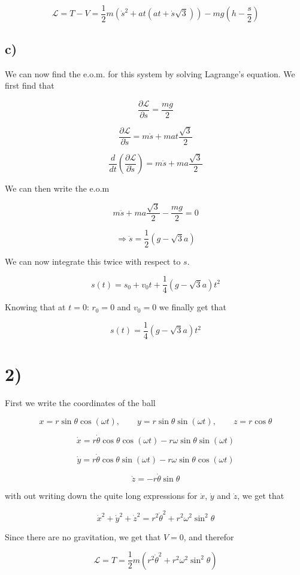\documentclass[a4paper,norsk, 10pt]{article}
\begin{document}
$$
\mathcal{L} = T -V = \frac{1}{2}m(\dot{s}^2 + at(at + \dot{s}\sqrt{3})) - mg(h-\frac{s}{2})
$$

\subsection*{c)}
We can now find the e.o.m. for this system by solving Lagrange's equation. We first find that

$$
\frac{\partial \mathcal{L}}{\partial s} = \frac{mg}{2}
$$

$$
\frac{\partial \mathcal{L}}{\partial \dot{s}} = m\dot{s} +mat\frac{\sqrt{3}}{2}
$$

$$
\frac{d}{dt}\left(\frac{\partial \mathcal{L}}{\partial \dot{s}} \right) = m\ddot{s} + ma\frac{\sqrt{3}}{2}
$$

We can then write the e.o.m

$$
m\ddot{s} + ma\frac{\sqrt{3}}{2} - \frac{mg}{2} = 0
$$

$$
\Rightarrow \ddot{s} = \frac{1}{2}(g-\sqrt{3}a)
$$

We can now integrate this twice with respect to $s$.

$$
s(t) = s_0 +v_0t + \frac{1}{4}(g-\sqrt{3}a)t^2
$$

Knowing that at $t=0$: $r_0 = 0$ and $v_0 = 0$ we finally get that

$$
s(t) = \frac{1}{4}(g-\sqrt{3}a)t^2
$$

\section*{2)}
First we write the coordinates of the ball

$$
x = r\sin\theta \cos(\omega t), \qquad y = r\sin\theta \sin(\omega t), \qquad z = r\cos \theta
$$

$$
\dot{x} = r\dot{\theta}\cos\theta \cos(\omega t) - r\omega\sin\theta \sin(\omega t) 
$$

$$
\dot{y} = r\dot{\theta}\cos\theta \sin(\omega t) - r\omega\sin\theta \cos(\omega t) 
$$

$$
\dot{z} = -r\dot{\theta}\sin \theta
$$

with out writing down the quite long expressions for $\dot{x}$, $\dot{y}$ and $\dot{z}$, we get that

$$
\dot{x}^2 + \dot{y}^2 + \dot{z}^2 = r^2\dot{\theta}^2 + r^2\omega^2\sin^2 \theta
$$

Since there are no gravitation, we get that $V = 0$, and therefor

$$
\mathcal{L} = T = \frac{1}{2}m(r^2\dot{\theta}^2 + r^2\omega^2\sin^2\theta)
$$
\end{document}
